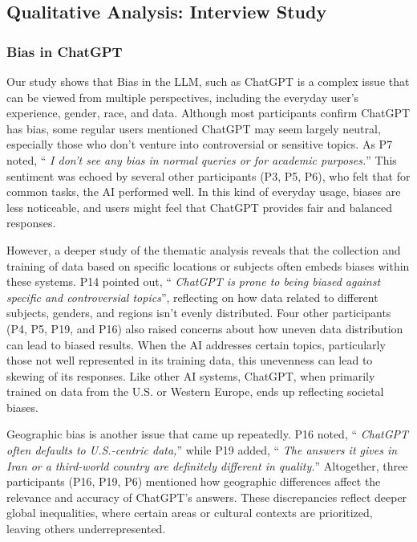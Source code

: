 \documentclass[sigconf]{acmart}
\begin{document}
\subsection{Qualitative Analysis: Interview Study }

\subsubsection{Bias in ChatGPT}
\hfill \break


Our study shows that Bias in the LLM, such as ChatGPT is a complex issue that can be viewed from multiple perspectives, including the everyday user's experience, gender, race, and data. Although most participants confirm ChatGPT has bias, some regular users mentioned ChatGPT may seem largely neutral, especially those who don't venture into controversial or sensitive topics. As P7 noted, \enquote { \emph {I don't see any bias in normal queries or for academic purposes.}} This sentiment was echoed by several other participants (P3, P5, P6), who felt that for common tasks, the AI performed well. In this kind of everyday usage, biases are less noticeable, and users might feel that ChatGPT provides fair and balanced responses.

However, a deeper study of the thematic analysis reveals that the collection and training of data based on specific locations or subjects often embeds biases within these systems. P14 pointed out, \enquote { \emph {ChatGPT is prone to being biased against specific and controversial topics}}, reflecting on how data related to different subjects, genders, and regions isn’t evenly distributed. Four other participants (P4, P5, P19, and P16) also raised concerns about how uneven data distribution can lead to biased results. When the AI addresses certain topics, particularly those not well represented in its training data, this unevenness can lead to skewing of its responses. Like other AI systems, ChatGPT, when primarily trained on data from the U.S. or Western Europe, ends up reflecting societal biases.

Geographic bias is another issue that came up repeatedly. P16 noted, \enquote { \emph {ChatGPT often defaults to U.S.-centric data,}} while P19 added, \enquote { \emph {The answers it gives in Iran or a third-world country are definitely different in quality.}} Altogether, three participants (P16, P19, P6) mentioned how geographic differences affect the relevance and accuracy of ChatGPT's answers. These discrepancies reflect deeper global inequalities, where certain areas or cultural contexts are prioritized, leaving others underrepresented.
\end{document}
